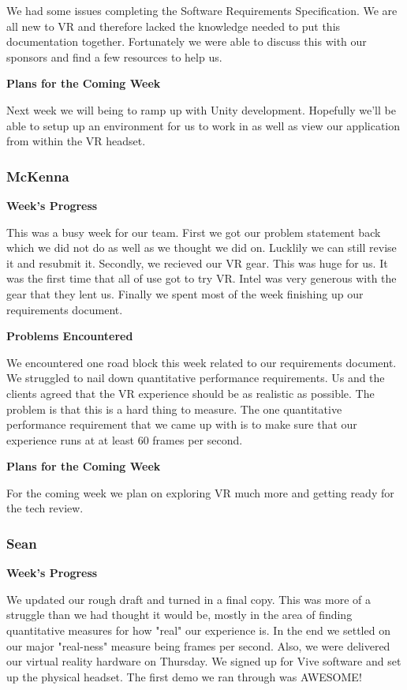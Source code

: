 \documentclass[10pt,journal,compsoc,onecolumn, draftclsnofoot]{IEEEtran}
\begin{document}
We had some issues completing the Software Requirements Specification. We are all new to VR and therefore lacked the knowledge needed to put this documentation together. Fortunately we were able to discuss this with our sponsors and find a few resources to help us.

\noindent \textbf{Plans for the Coming Week}

Next week we will being to ramp up with Unity development. Hopefully we'll be able to setup up an environment for us to work in as well as view our application from within the VR headset.

\subsubsection{McKenna}
\noindent \textbf{Week's Progress}

This was a busy week for our team. First we got our problem statement back which we did not do as well as we thought we did on. Lucklily we can still revise it and resubmit it. Secondly, we recieved our VR gear. This was huge for us. It was the first time that all of use got to try VR. Intel was very generous with the gear that they lent us. Finally we spent most of the week finishing up our requirements document.

\noindent \textbf{Problems Encountered}

We encountered one road block this week related to our requirements document. We struggled to nail down quantitative performance requirements. Us and the clients agreed that the VR experience should be as realistic as possible. The problem is that this is a hard thing to measure. The one quantitative performance requirement that we came up with is to make sure that our experience runs at at least 60 frames per second.

\noindent \textbf{Plans for the Coming Week}

For the coming week we plan on exploring VR much more and getting ready for the tech review.

\subsubsection{Sean}
\noindent \textbf{Week's Progress}

We updated our rough draft and turned in a final copy.  This was more of a struggle than we had thought it would be, mostly in the area of finding quantitative measures for how "real" our experience is. In the end we settled on our major "real-ness" measure being frames per second.  Also, we were delivered our virtual reality hardware on Thursday.  We signed up for Vive software and set up the physical headset.  The first demo we ran through was AWESOME!
\end{document}

